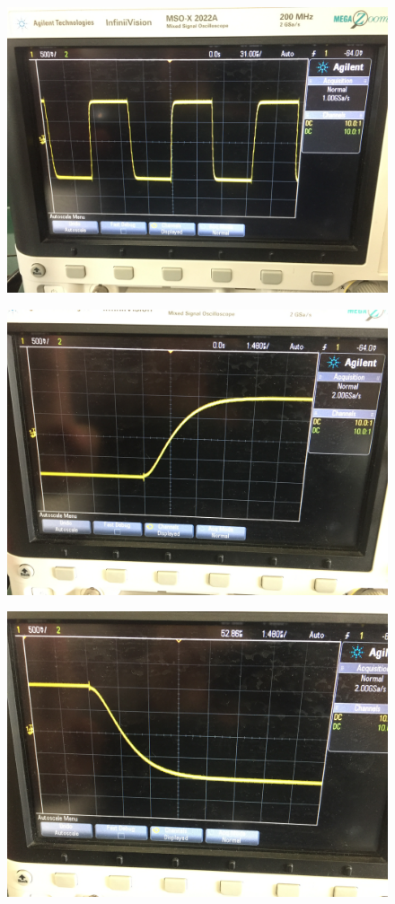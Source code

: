 \documentclass{article}
\begin{document}
\begin{figure}[H]
	\centering
	\includegraphics[width=0.7\linewidth]{IMG_6446}
	\label{fig:img6446}
\end{figure}
\begin{figure}[H]
	\centering
	\includegraphics[width=0.7\linewidth]{IMG_6447}
	\label{fig:img6447}
\end{figure}
\begin{figure}[H]
	\centering
	\includegraphics[width=0.7\linewidth]{IMG_6448}
	\label{fig:img6448}
\end{figure}
\end{document}
